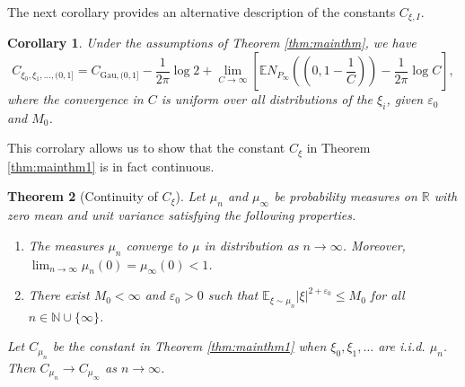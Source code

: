 \documentclass[12pt, reqno]{amsart}
\theoremstyle{plain}
\newtheorem{theorem}{Theorem}[section]
\newtheorem{corollary}[theorem]{Corollary}
\theoremstyle{definition}
\newcommand\N{{\mathbb{N}}}
\newcommand\R{{\mathbb{R}}}
\renewcommand\P{{\mathbb{P}}}
\newcommand\E{{\mathbb{E}}}
\newcommand{\ep}{\varepsilon}
\begin{document}
 
The next corollary provides an alternative description of the constants $C_{\xi, I}$.
 \begin{corollary}\label{cor:C}
 	Under the assumptions of Theorem \ref{thm:mainthm}, we have
 	\begin{equation}
 		C_{\xi_0, \xi_1, \dots, (0, 1]} =C_{\mathrm{Gau}, (0, 1]}- \frac{1}{2\pi}\log 2+\lim_{C\to\infty}\left [ \E N_{P_{\infty}} \left (\left (0, 1-\frac1C\right )\right ) -\frac{1}{2\pi}\log C\right ], \label{eq:C}
 	\end{equation}
 where the convergence in $C$ is uniform over all distributions of the $\xi_i$, given $\ep_0$ and $M_0$.
 \end{corollary}
 
 
 
This corrolary allows us to show that the constant $C_{\xi}$ in Theorem \ref{thm:mainthm1} is in fact continuous.  
 \begin{theorem}[Continuity of $C_{\xi}$]\label{thm:cont}
 	Let $\mu_{n}$ and $\mu_{\infty}$ be probability measures on $\R$ with zero mean and unit variance satisfying the following properties.
 	\begin{enumerate}
 		\item The measures $\mu_{n}$ converge to $\mu$ in distribution as $n\to\infty$. Moreover, $\lim_{n\to\infty}\mu_{n}(0)= \mu_\infty(0)<1$.
 		\item There exist $M_0 <\infty$ and $\ep_0>0$ such that
 		$\E_{\xi\sim \mu_n}|\xi|^{2+\ep_0} \le M_0 $ for all $n\in \N\cup\{\infty\}$.
 	\end{enumerate}
 Let $C_{\mu_{n}}$ be the constant in Theorem \ref{thm:mainthm1} when $\xi_0, \xi_1, \dots$ are i.i.d. $\mu_{n}$.	Then $C_{\mu_{n}}\to C_{\mu_\infty}$ as $n \rightarrow \infty$.
 \end{theorem}


 
  
\end{document}
